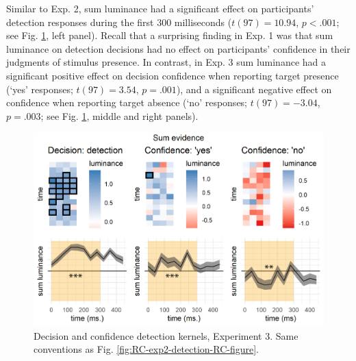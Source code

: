 \documentclass[12pt,twoside]{reedthesis}
\begin{document}
Similar to Exp. 2, sum luminance had a significant effect on participants' detection responses during the first 300 milliseconds (\(t(97) = 10.94\), \(p < .001\); see Fig. \ref{fig:RC-exp3-detection-RC-figure}, left panel). Recall that a surprising finding in Exp. 1 was that sum luminance on detection decisions had no effect on participants' confidence in their judgments of stimulus presence. In contrast, in Exp. 3 sum luminance had a significant positive effect on decision confidence when reporting target presence (`yes' responses; \(t(97) = 3.54\), \(p = .001\)), and a significant negative effect on confidence when reporting target absence (`no' responses; \(t(97) = -3.04\), \(p = .003\); see Fig. \ref{fig:RC-exp3-detection-RC-figure}, middle and right panels).


\begin{figure}
\includegraphics[width=\textwidth]{figure/RC/RC-exp3-detection-RC-enhanced} \caption[Decision kernels in detection, Exp. 3]{Decision and confidence detection kernels, Experiment 3. Same conventions as Fig. \ref{fig:RC-exp2-detection-RC-figure}.}\label{fig:RC-exp3-detection-RC-figure}
\end{figure}
\end{document}
